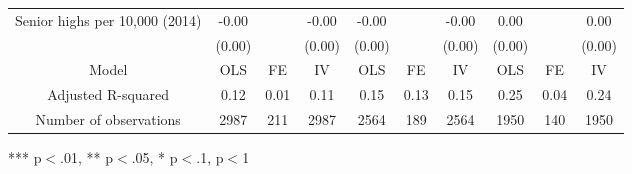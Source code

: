 \begin{tabular}{llllllllll}
\multicolumn{1}{l}{Senior highs per 10,000 (2014)} &
  \multicolumn{1}{|c}{-0.00 } &
  \multicolumn{1}{c}{} &
  \multicolumn{1}{c}{-0.00 } &
  \multicolumn{1}{c}{-0.00 } &
  \multicolumn{1}{c}{} &
  \multicolumn{1}{c}{-0.00 } &
  \multicolumn{1}{c}{0.00 } &
  \multicolumn{1}{c}{} &
  \multicolumn{1}{c}{0.00 } \\
\multicolumn{1}{l}{} &
  \multicolumn{1}{|c}{(0.00)} &
  \multicolumn{1}{c}{} &
  \multicolumn{1}{c}{(0.00)} &
  \multicolumn{1}{c}{(0.00)} &
  \multicolumn{1}{c}{} &
  \multicolumn{1}{c}{(0.00)} &
  \multicolumn{1}{c}{(0.00)} &
  \multicolumn{1}{c}{} &
  \multicolumn{1}{c}{(0.00)} \\
\multicolumn{1}{c}{Model} &
  \multicolumn{1}{|c}{OLS} &
  \multicolumn{1}{c}{FE} &
  \multicolumn{1}{c}{IV} &
  \multicolumn{1}{c}{OLS} &
  \multicolumn{1}{c}{FE} &
  \multicolumn{1}{c}{IV} &
  \multicolumn{1}{c}{OLS} &
  \multicolumn{1}{c}{FE} &
  \multicolumn{1}{c}{IV} \\
\multicolumn{1}{c}{Adjusted R-squared} &
  \multicolumn{1}{|c}{0.12} &
  \multicolumn{1}{c}{0.01} &
  \multicolumn{1}{c}{0.11} &
  \multicolumn{1}{c}{0.15} &
  \multicolumn{1}{c}{0.13} &
  \multicolumn{1}{c}{0.15} &
  \multicolumn{1}{c}{0.25} &
  \multicolumn{1}{c}{0.04} &
  \multicolumn{1}{c}{0.24} \\
\multicolumn{1}{c}{Number of observations} &
  \multicolumn{1}{|c}{2987} &
  \multicolumn{1}{c}{211} &
  \multicolumn{1}{c}{2987} &
  \multicolumn{1}{c}{2564} &
  \multicolumn{1}{c}{189} &
  \multicolumn{1}{c}{2564} &
  \multicolumn{1}{c}{1950} &
  \multicolumn{1}{c}{140} &
  \multicolumn{1}{c}{1950} \\
\cline{1-10}
\end{tabular}

\footnotesize{
*** p$<$.01, ** p$<$.05, * p$<$.1,  p$<$1
}
